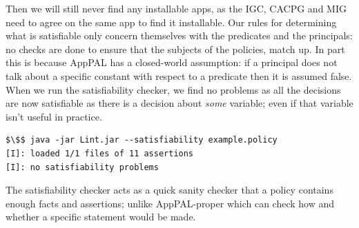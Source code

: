 \documentclass[thesis.tex]{subfiles}
\begin{document}
Then we will still never find any installable apps, as the \ac{IGC}, \ac{CACPG}
and \ac{MIG} need to agree on the same app to find it installable. Our rules for
determining what is satisfiable only concern themselves with the predicates and
the principals: no checks are done to ensure that the subjects of the policies,
match up. In part this is because AppPAL has a closed-world assumption: if a
principal does not talk about a specific constant with respect to a predicate
then it is assumed false. When we run the satisfiability checker, we find no
problems as all the decisions are now satisfiable as there is a decision about
\emph{some} variable; even if that variable isn't useful in practice.

\noindent\begin{minipage}{\linewidth}\vspace{1em}
\begin{lstlisting}
$\$$ java -jar Lint.jar --satisfiability example.policy
[I]: loaded 1/1 files of 11 assertions
[I]: no satisfiability problems
\end{lstlisting}
\end{minipage}

The satisfiability checker acts as a quick sanity checker that a policy contains
enough facts and assertions; unlike AppPAL-proper which can check how and
whether a specific statement would be made.  

%
\end{document}
